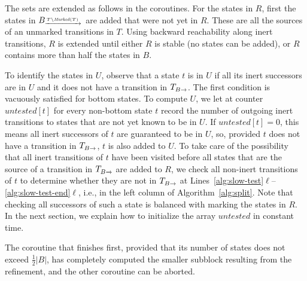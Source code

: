 \documentclass[a4paper,10pt]{article}
\theoremstyle{definition}
\theoremstyle{plain}
\newcommand{\pijl}[1]{\mathrel{\text{$\xrightarrow{\smash[t]{#1}}$}}}
\newcommand{\size}[1]{\left\lvert #1 \right\rvert}
\newcommand{\TB}{T_{B\pijl{}}}
\newcommand{\Marked}{\mathit{Marked}}
\begin{document}
The sets are extended as follows in the coroutines.
For the states in $R$, first the states in $B_{\pijl{T \setminus \Marked(T)}}$ are added that were not yet in $R$.
These are all the sources of an unmarked transitions in $T$.
Using backward reachability along inert transitions,
$R$ is extended until either $R$ is stable (no states can be added), or $R$ contains more than half the states in $B$.

To identify the states in $U$, observe that a state $t$ is in $U$
if all its inert successors are in $U$
and it does not have a transition in $\TB$.
The first condition is vacuously satisfied for bottom states.
To compute $U$, we let at counter $\mathit{untested}[t]$ for every non-bottom state $t$ record the number of outgoing inert transitions to states that are not yet known to be in $U$.
If $\mathit{untested}[t] = 0$, this means all inert successors of $t$ are guaranteed to be in $U$, so, provided $t$ does not
have a transition in $\TB$, $t$ is also added to $U$.
To take care of the possibility that all inert transitions of $t$ have been visited before all states that are the source of a transition in
$\TB$ are added to $R$, we check all non-inert transitions of $t$ to determine
whether they are not in $\TB$ at Lines~\ref{alg:slow-test}$\ell$--\ref{alg:slow-test-end}$\ell$, i.e., in the left column of Algorithm~\ref{alg:split}.
Note that checking all successors of such a state is balanced with marking the states in $R$.
In the next section, we explain how to initialize the array $\mathit{untested}$ in constant time.

The coroutine that finishes first,
provided that its number of states does not exceed $\frac{1}{2}\size{B}$,
has completely computed the smaller subblock resulting from the refinement,
and the other coroutine can be aborted.



\end{document}
